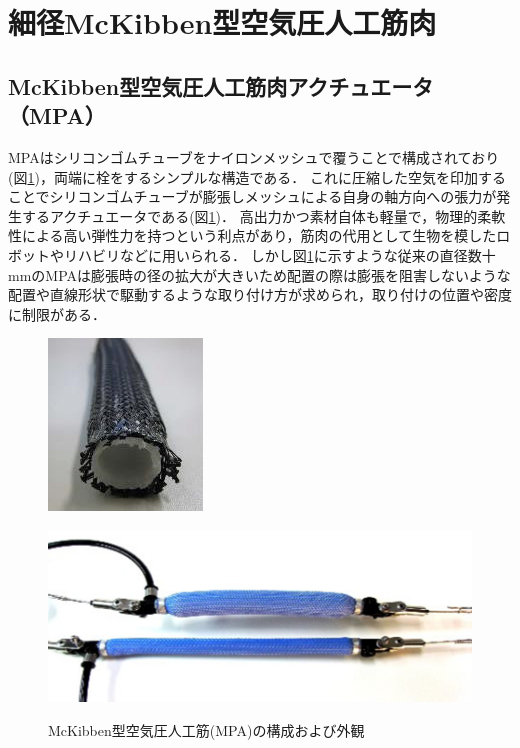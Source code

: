 \newpage
\section{細径McKibben型空気圧人工筋肉}
\subsection{McKibben型空気圧人工筋肉アクチュエータ（MPA）}
MPAはシリコンゴムチューブをナイロンメッシュで覆うことで構成されており(図\ref{fig:MPA})，両端に栓をするシンプルな構造である．
これに圧縮した空気を印加することでシリコンゴムチューブが膨張しメッシュによる自身の軸方向への張力が発生するアクチュエータである(図\ref{fig:MPA})．
高出力かつ素材自体も軽量で，物理的柔軟性による高い弾性力を持つという利点があり，筋肉の代用として生物を模したロボットやリハビリなどに用いられる．
しかし図\ref{fig:MPA}に示すような従来の直径数十 mmのMPAは膨張時の径の拡大が大きいため配置の際は膨張を阻害しないような配置や直線形状で駆動するような取り付け方が求められ，取り付けの位置や密度に制限がある．
\begin{figure}[b]
  \begin{minipage}{0.49\columnwidth}
    \vspace{4mm}
    \centering
    \includegraphics[scale=1]{image/MPA_kousei.png}
    \vspace{3mm}
    \label{fig:Structure}
  \end{minipage}
  \begin{minipage}{0.49\columnwidth}
    \vspace{25mm}
    \centering
    \includegraphics[scale=.8]{image/MPA_dousa.png}
    \label{fig:move}
  \end{minipage}
  \caption{McKibben型空気圧人工筋(MPA)の構成および外観\cite{中西大輔2020}}
  \label{fig:MPA}
\end{figure}
